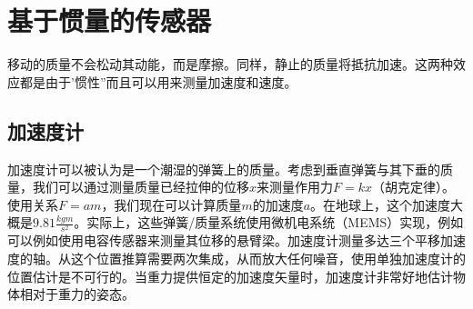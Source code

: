 
\section{基于惯量的传感器}
移动的质量不会松动其动能，而是摩擦。同样，静止的质量将抵抗加速。这两种效应都是由于'惯性''而且可以用来测量加速度和速度。

\subsection{加速度计}
加速度计可以被认为是一个潮湿的弹簧上的质量。考虑到垂直弹簧与其下垂的质量，我们可以通过测量质量已经拉伸的位移$x$来测量作用力$F=kx$（胡克定律）。使用关系$F=am$，我们现在可以计算质量$m$的加速度$a$。在地球上，这个加速度大概是$9.81\frac{kgm}{s^2}$。实际上，这些弹簧/质量系统使用微机电系统（MEMS）实现，例如可以例如使用电容传感器来测量其位移的悬臂梁。加速度计测量多达三个平移加速度的轴。从这个位置推算需要两次集成，从而放大任何噪音，使用单独加速度计的位置估计是不可行的。当重力提供恒定的加速度矢量时，加速度计非常好地估计物体相对于重力的姿态。



